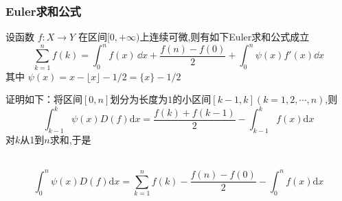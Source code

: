 
\subsubsection{Euler求和公式}
\begin{theorem}{}
    设函数 $f:X\to Y$ 在区间$[0,+\infty)$上连续可微,则有如下Euler求和公式成立	
        \begin{equation}{}
            \sum_{k=1}^{n}f(k)=\int_{0}^{n}f(x)\,\dd x
            +\frac{f(n)-f(0)}{2}+\int_{0}^{n}\psi(x)f'(x)\dd x
        \end{equation}
    其中 $\psi(x)=x-\lfloor x \rfloor-1/2=\{x\}-1/2$
\end{theorem}

证明如下：将区间$[0,n]$划分为长度为$1$的小区间$[k-1,k](k=1,2,\cdots,n)$,则
​	\[

​			\int_{k-1}^{k}\psi(x)D(f)\mathrm{d}x=\frac{f(k)+f(k-1)}{2}-\int_{k-1}^{k}f(x)\mathrm{d}x

​		\]
​	    对$k$从1到$n$求和,于是

​		\[

​			\int_{0}^{n}\psi(x)D(f)\mathrm{d}x=\sum_{k=1}^{n}f(k)-\frac{f(n)-f(0)}{2}-\int_{0}^{n}f(x)\mathrm{d}x  

​		\]